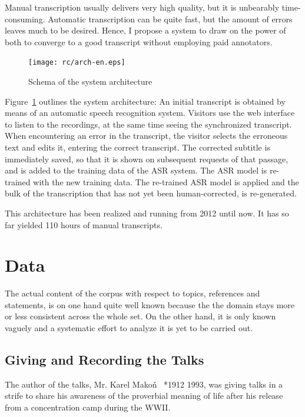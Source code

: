 \documentclass[hidelinks,12pt,a4paper]{report}
\begin{document}
Manual transcription usually delivers very high quality, but it is unbearably
time-consuming. Automatic transcription can be quite fast, but the amount of
errors leaves much to be desired. Hence, I propose a system
to draw on the power of both to converge to a good transcript without employing
paid annotators.

\begin{figure}[htpb]
\texttt{[image: rc/arch-en.eps]}
\caption{Schema of the system architecture}
\label{fig:arch}
\end{figure}

Figure~\ref{fig:arch} outlines the system architecture:
{An initial transcript is obtained by means of an automatic speech recognition
system.\label{enum:arch:init}}
{Visitors use the web interface to listen to the recordings,
at the same time seeing the synchronized transcript.}
{When encountering an error in the transcript, the visitor selects the
erroneous text and edits it, entering the correct transcript.}
{The corrected subtitle is immediately saved, so that it is shown on
subsequent requests of that passage, and
is added to the training data of the ASR system.}
{The ASR model is re-trained with the new training data.}
{The re-trained ASR model is applied and the bulk of the transcription that
has not yet been human-corrected, is re-generated.}

This architecture has been realized and running from 2012 until now. It has so
far yielded 110 hours of manual transcripts.


\chapter{Data}

The actual content of the corpus with respect to topics, references and
statements, is on one hand quite well known
because the the domain stays
more or less consistent across the whole set. On the other hand, it is only
known vaguely and a systematic effort to analyze it is yet to be carried out.

\section{Giving and Recording the Talks}

The author of the talks, Mr. Karel Mako\v{n}~\cite{hajek2007cesky} *1912
\textdagger{}1993, was giving talks in a strife to share his awareness of the
proverbial meaning of life after his
release from a concentration camp during the WWII.
\end{document}

